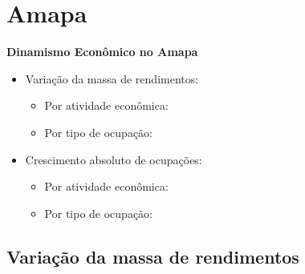 \documentclass[8pt]{beamer}
\begin{document}
\begin{frame}
\textit{\hyperlink{indice_principal_amz_am}{}}

\end{frame}

\begin{frame}
\textit{\hyperlink{indice_principal_amz_am}{}}

\end{frame}

\section{Amapa}

\begin{frame}[label=indice_principal_amz_ap]{}

\textit{\hyperlink{indice_principal}{}}

\textbf{Dinamismo Econômico no Amapa}
\vspace{2mm}

\begin{itemize}

\item{Variação da massa de rendimentos:
	\begin{itemize}
	\item{Por atividade econômica: \hyperlink{amzaprkngvmassaporcnae2dig}{}}
	\item{Por tipo de ocupação: \hyperlink{amzaprkngvmassaporcod2dig}{}}
	\end{itemize}
}
\vspace{1mm}

\item{Crescimento  absoluto de ocupações:
	\begin{itemize}
	\item{Por atividade econômica: \hyperlink{amzaprkngnocuporcnae2dig}{}}
	\item{Por tipo de ocupação: \hyperlink{amzaprkngnocuporcod2dig}{}}
	\end{itemize}
}
\vspace{1mm}

\end{itemize}

\end{frame}


\subsection{Variação da massa de rendimentos}
\end{document}
